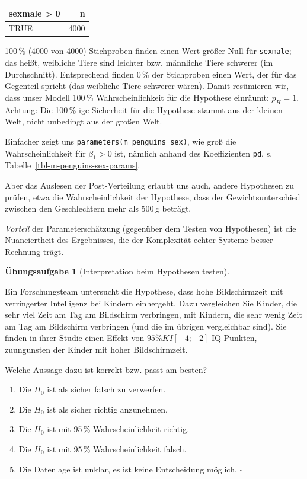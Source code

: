 \documentclass[
  ngerman,
  letterpaper,
  twoside,
  open=any]{scrbook}
\providecommand{\tightlist}{%
  \setlength{\itemsep}{0pt}\setlength{\parskip}{0pt}}\usepackage{longtable,booktabs,array}
\newcounter{none} %
\theoremstyle{definition}
\theoremstyle{plain}
\theoremstyle{definition}
\newtheorem{exercise}{Übungsaufgabe}[chapter]
\theoremstyle{definition}
\theoremstyle{definition}
\theoremstyle{definition}
\newtheorem{exercise}{Übungsaufgabe}[chapter]
\theoremstyle{remark}
\begin{document}
{\def\LTcaptype{none} %
\begin{longtable}[]{@{}lr@{}}
\toprule\noalign{}
sexmale \textgreater{} 0 & n \\
\midrule\noalign{}
\endhead
\bottomrule\noalign{}
\endlastfoot
TRUE & 4000 \\
\end{longtable}
}

100\,\% (4000 von 4000) Stichproben finden einen Wert größer Null für
\texttt{sexmale}; das heißt, weibliche Tiere sind leichter bzw.
männliche Tiere schwerer (im Durchschnitt). Entsprechend finden 0\,\%
der Stichproben einen Wert, der für das Gegenteil spricht (das weibliche
Tiere schwerer wären). Damit resümieren wir, dass unser Modell 100\,\%
Wahrscheinlichkeit für die Hypothese einräumt: \(p_H = 1\). Achtung: Die
100\,\%-ige Sicherheit für die Hypothese stammt aus der kleinen Welt,
nicht unbedingt aus der großen Welt.

Einfacher zeigt uns \texttt{parameters(m\_penguins\_sex)}, wie groß die
Wahrscheinlichkeit für \(\beta_1 > 0\) ist, nämlich anhand des
Koeffizienten \texttt{pd}, s. Tabelle~\ref{tbl-m-penguins-sex-params}.

Aber das Auslesen der Post-Verteilung erlaubt uns auch, andere
Hypothesen zu prüfen, etwa die Wahrscheinlichkeit der Hypothese, dass
der Gewichtsunterschied zwischen den Geschlechtern mehr als 500\,g
beträgt.

\emph{Vorteil} der Parameterschätzung (gegenüber dem Testen von
Hypothesen) ist die Nuanciertheit des Ergebnisses, die der Komplexität
echter Systeme besser Rechnung trägt.

\begin{exercise}[Interpretation beim Hypothesen
testen]\protect\hypertarget{exr-peer-Interpretation-Hyp-testen}{}\label{exr-peer-Interpretation-Hyp-testen}

Ein Forschungsteam untersucht die Hypothese, dass hohe Bildschirmzeit
mit verringerter Intelligenz bei Kindern einhergeht. Dazu vergleichen
Sie Kinder, die sehr viel Zeit am Tag am Bildschirm verbringen, mit
Kindern, die sehr wenig Zeit am Tag am Bildschirm verbringen (und die im
übrigen vergleichbar sind). Sie finden in ihrer Studie einen Effekt von
\(95\% KI[-4;-2]\) IQ-Punkten, zuungunsten der Kinder mit hoher
Bildschirmzeit.

Welche Aussage dazu ist korrekt bzw. passt am besten?

\begin{enumerate}
\def\labelenumi{\Alph{enumi})}
\tightlist
\item
  Die \(H_0\) ist als sicher falsch zu verwerfen.
\item
  Die \(H_0\) ist als sicher richtig anzunehmen.
\item
  Die \(H_0\) ist mit 95\,\% Wahrscheinlichkeit richtig.
\item
  Die \(H_0\) ist mit 95\,\% Wahrscheinlichkeit falsch.
\item
  Die Datenlage ist unklar, es ist keine Entscheidung möglich.
  \(\square\)
\end{enumerate}

\end{exercise}
\end{document}
